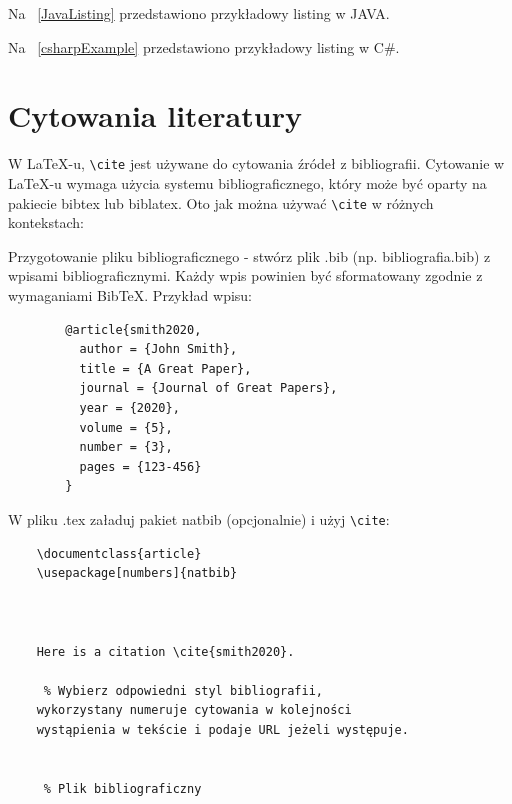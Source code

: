 

Na \listingname~\ref{JavaListing} przedstawiono przykładowy listing w JAVA.



Na \listingname~\ref{csharpExample} przedstawiono przykładowy listing w C\#.





\section{Cytowania literatury}

W LaTeX-u, \texttt{\textbackslash cite} jest używane do cytowania źródeł z bibliografii. Cytowanie w LaTeX-u wymaga użycia systemu bibliograficznego, który może być oparty na pakiecie bibtex lub biblatex. Oto jak można używać \texttt{\textbackslash cite} w różnych kontekstach:

Przygotowanie pliku bibliograficznego - stwórz plik .bib (np. bibliografia.bib) z wpisami bibliograficznymi. Każdy wpis powinien być sformatowany zgodnie z wymaganiami BibTeX. Przykład wpisu:
\begin{verbatim}
        @article{smith2020,
          author = {John Smith},
          title = {A Great Paper},
          journal = {Journal of Great Papers},
          year = {2020},
          volume = {5},
          number = {3},
          pages = {123-456}
        }
        \end{verbatim}

W pliku .tex załaduj pakiet natbib (opcjonalnie) i użyj \texttt{\textbackslash cite}:

\begin{verbatim}
    \documentclass{article}
    \usepackage[numbers]{natbib} 

    

    Here is a citation \cite{smith2020}.

     % Wybierz odpowiedni styl bibliografii,
    wykorzystany numeruje cytowania w kolejności 
    wystąpienia w tekście i podaje URL jeżeli występuje.

    
     % Plik bibliograficzny

    

\end{verbatim}

